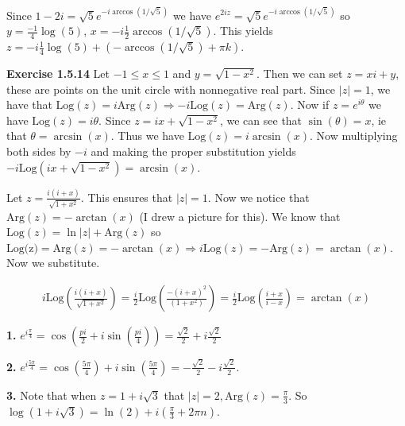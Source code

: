 \documentclass[a4paper]{article}
\begin{document}
Since $1-2i =\sqrt{5}e^{-i \arccos(1/\sqrt{5})}$ we have %
$e^{2iz} = \sqrt{5} e^{-i\arccos(1/\sqrt{5})}$ so $y = \frac{-1}{4}\log(5)$,
$x=-i \frac{1}{2}\arccos(1/\sqrt{5})$. This yields $z = -i\frac{1}{4} \log(5) +
(-\arccos(1/\sqrt{5})+\pi k)$.\vspace{10pt}

\textbf{Exercise 1.5.14} Let $-1 \leq x \leq 1$ and $y = \sqrt{1-x^2}$. Then we
can set $z = xi + y$, these are points on the unit circle with nonnegative real
part. Since $|z| = 1$, we have that $\text{Log}(z) = i \text{Arg}(z)
\Rightarrow -i\text{Log}(z) = \text{Arg}(z)$. Now if $z = e^{i\theta}$ we have
$\text{Log}(z) = i\theta$. Since $z= ix + \sqrt{1-x^2}$, we can see that
$\sin(\theta) = x$, ie that $\theta = \arcsin(x)$. Thus we have $\text{Log}(z) =
i\arcsin(x)$. Now multiplying both sides by $-i$ and making the proper
substitution yields $-i\text{Log}(ix+\sqrt{1-x^2}) =
\arcsin(x)$. \vspace{10pt}

Let $z = \frac{i(i+x)}{\sqrt{1+x^2}}$. This ensures that $|z| = 1$. Now we
notice that $\text{Arg}(z) = -\arctan(x)$ (I drew a picture for this). We know that $\text{Log}(z) =\ln|z| + \text{Arg}(z)$ so
$\text{Log(z}) =\text{Arg}(z) = -\arctan (x)\Rightarrow i\text{Log}(z) =
-\text{Arg}(z) = \arctan(x)$. Now we substitute.

\begin{align*}
  i\text{Log}\left(\frac{i(i+x)}{\sqrt{1+x^{2}}}\right) = \frac{i}{2} \text{Log}\left(\frac{-(i+x)^{2}}{(1+x^2)}\right)=\frac{i}{2} \text{Log}\left(\frac{i+x}{i-x}\right)= \arctan(x)
\end{align*}
\vspace{10pt}

\textbf{1.} $e^{i\frac{\pi}{4}}= \cos(\frac{pi}{2}+i\sin(\frac{pi}{4}))=
\frac{\sqrt{2}}{2}+ i\frac{\sqrt{2}}{2}$\vspace{10pt}

\textbf{2.} $e^{i\frac{5\pi}{4}}=\cos(\frac{5\pi}{4})+i\sin(\frac{5\pi}{4}) =
-\frac{\sqrt{2}}{2}-i\frac{\sqrt{2}}{2}$.\vspace{10pt}

\textbf{3.} Note that when $z = 1 + i \sqrt{3}$ that $|z| = 2,\text{Arg}(z) =
\frac{\pi}{3}$. So $\log(1+i\sqrt{3})= \ln(2) + i(\frac{\pi}{3} + 2\pi
n)$.\vspace{10pt}
\end{document}
